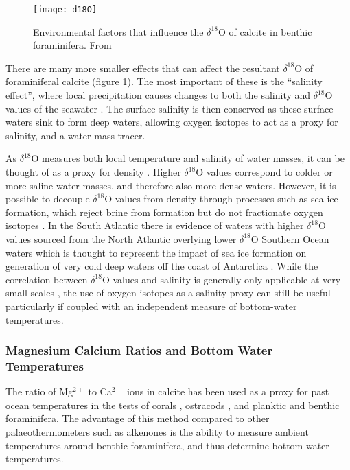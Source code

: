 \begin{figure}[h]
	\texttt{[image: d18O]}
	\centering
	\caption{Environmental factors that influence the $\delta^{18}\text{O}$ of calcite in benthic foraminifera. From \citet{raveloChapterEighteenUse2007}}
	\label{fig:d18O}
\end{figure}

There are many more smaller effects that can affect the resultant $\delta^{18}\text{O}$ of foraminiferal calcite (figure \ref{fig:d18O}). The most important of these is the ``salinity effect'', where local precipitation causes changes to both the salinity and $\delta^{18}\text{O}$ values of the seawater \citep{benwayOxygenIsotopesUpperocean2004}. The surface salinity is then conserved as these surface waters sink to form deep waters, allowing oxygen isotopes to act as a proxy for salinity, and a water mass tracer.

As $\delta^{18}\text{O}$ measures both local temperature and salinity of water masses, it can be thought of as a proxy for density \citep{guAssessingAbilityZonal2019}. Higher $\delta^{18}\text{O}$ values correspond to colder or more saline water masses, and therefore also more dense waters. However, it is possible to decouple $\delta^{18}\text{O}$ values from density through processes such as sea ice formation, which reject brine from formation but do not fractionate oxygen isotopes \citep{gebbieMeridionalCirculationLast2006}. In the South Atlantic there is evidence of waters with higher $\delta^{18}\text{O}$ values sourced from the North Atlantic overlying lower $\delta^{18}\text{O}$ Southern Ocean waters \citep{lynch-stieglitzMeridionalOverturningCirculation2006} which is thought to represent the impact of sea ice formation on generation of very cold deep waters off the coast of Antarctica \citep{toggweilerEffectSeaIce1995}. While the correlation between $\delta^{18}\text{O}$ values and salinity is generally only applicable at very small scales \citep{conroyConstraintsSalinityOxygen2014}, the use of oxygen isotopes as a salinity proxy can still be useful - particularly if coupled with an independent measure of bottom-water temperatures.

\subsubsection{Magnesium Calcium Ratios and Bottom Water Temperatures}
\label{sec:mgca}

The ratio of Mg$^{2+}$ to Ca$^{2+}$ ions in calcite has been used as a proxy for past ocean temperatures in the tests of corals \citep{rossCalibrationSrCa2019}, ostracods \citep{rodriguez-tovarTraceFossilsEvidence2019}, and planktic \citep{hollandConstrainingMultipleControls2020} and benthic \citep{barrientosArcticOceanBenthic2018} foraminifera. The advantage of this method compared to other palaeothermometers such as alkenones is the ability to measure ambient temperatures around benthic foraminifera, and thus determine bottom water temperatures.

